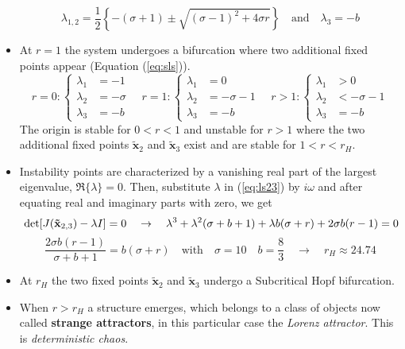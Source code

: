 \begin{itemize}
	\begin{equation}
		\lambda_{1,2}=\frac{1}{2}\left\{-(\sigma+1)\pm\sqrt{(\sigma-1)^2+4\sigma r}\right\}\quad\text{and}\quad
		\lambda_3=-b
	\end{equation}
	\item At $r=1$ the system undergoes a bifurcation where two additional fixed points appear (Equation (\ref{eq:sls})).
	\begin{equation}
		r=0:
		\begin{cases}
			\lambda_1&=-1\\
			\lambda_2&=-\sigma\\
			\lambda_3&=-b
		\end{cases}\quad
		r=1:
		\begin{cases}
			\lambda_1&=0\\
			\lambda_2&=-\sigma-1\\
			\lambda_3&=-b
		\end{cases}\quad
		r>1:
		\begin{cases}
			\lambda_1&>0\\
			\lambda_2&<-\sigma-1\\
			\lambda_3&=-b
		\end{cases}
	\end{equation}
	The origin is stable for $0<r<1$ and unstable for $r>1$ where the two additional fixed points $\mathbf{\tilde{x}}_2$ and $\mathbf{\tilde{x}}_3$ exist and are stable for $1<r<r_H$.
	\item Instability points are characterized by a vanishing real part of the largest eigenvalue, $\Re\{\lambda\}=0$.
	Then, substitute $\lambda$ in (\ref{eq:ls23}) by $i\omega$ and after equating real and imaginary parts with zero, we get
	\begin{equation}{\label{eq:ls23}}
		\det[J(\mathbf{\tilde{x}}_{2,3})-\lambda I]=0\quad\rightarrow\quad
		\lambda^3+\lambda^2(\sigma+b+1)+\lambda b(\sigma+r)+2\sigma b(r-1)=0
	\end{equation}
	\begin{equation}
		\frac{2\sigma b(r-1)}{\sigma+b+1}=b(\sigma+r)\quad\text{with}\quad \sigma=10\quad b=\frac{8}{3}\quad\rightarrow\quad r_H\approx24.74
	\end{equation}
	\item At $r_H$ the two fixed points $\mathbf{\tilde{x}}_2$ and $\mathbf{\tilde{x}}_3$ undergo a Subcritical Hopf bifurcation.
	\item When $r>r_H$ a structure emerges, which belongs to a class of objects now called {\textbf{strange attractors}}, in this particular case the \emph{Lorenz attractor}. This is \emph{deterministic chaos}.

\end{itemize}
